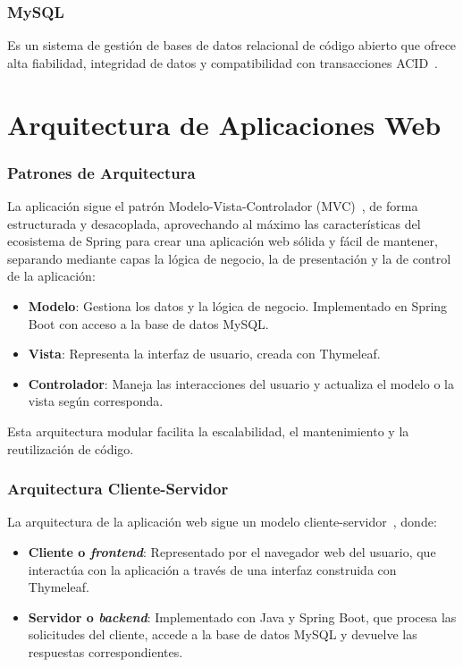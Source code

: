 \subsubsection{MySQL~\cite{mysql}}
Es un sistema de gestión de bases de datos relacional de código abierto que ofrece alta fiabilidad, integridad de datos y compatibilidad con transacciones ACID~\cite{acid}.

\section{Arquitectura de Aplicaciones Web}

\subsubsection{Patrones de Arquitectura}
La aplicación sigue el patrón Modelo-Vista-Controlador (MVC)~\cite{modelo-vista-controrlador}, de forma estructurada y desacoplada, aprovechando al máximo las características del ecosistema de Spring para crear una aplicación web sólida y fácil de mantener, separando mediante capas la lógica de negocio, la de presentación y la de control de la aplicación:
\begin{itemize}
\tightlist
   \item \textbf{Modelo}: Gestiona los datos y la lógica de negocio. Implementado en Spring Boot con acceso a la base de datos MySQL.
   \item \textbf{Vista}: Representa la interfaz de usuario, creada con Thymeleaf.
   \item \textbf{Controlador}: Maneja las interacciones del usuario y actualiza el modelo o la vista según corresponda.
\end{itemize}
Esta arquitectura modular facilita la escalabilidad, el mantenimiento y la reutilización de código.

\subsubsection{Arquitectura Cliente-Servidor}
La arquitectura de la aplicación web sigue un modelo cliente-servidor~\cite{client-server-model}, donde:
\begin{itemize}
\tightlist
   \item \textbf{Cliente o \emph{frontend}}: Representado por el navegador web del usuario, que interactúa con la aplicación a través de una interfaz construida con Thymeleaf.
   \item \textbf{Servidor o \emph{backend}}: Implementado con Java y Spring Boot, que procesa las solicitudes del cliente, accede a la base de datos MySQL y devuelve las respuestas correspondientes.
\end{itemize}
